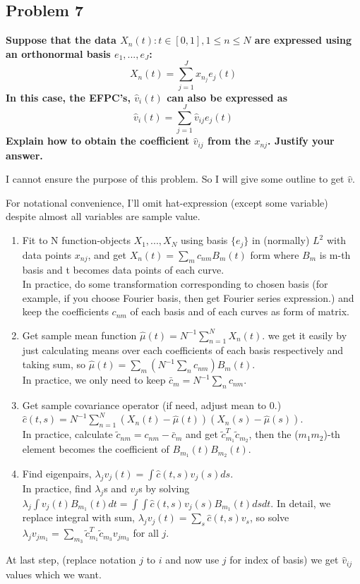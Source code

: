 \documentclass{article}
\begin{document}
\subsection{Problem 7}
\textbf{
Suppose that the data ${X_n(t):t\in[0,1], 1\leq n\leq N}$
are expressed using an orthonormal basis $e_1,...,e_J$:
\[X_n(t)=\sum_{j=1}^J x_{n_j}e_j(t)\]
In this case, the EFPC's, $\hat{v}_i(t)$ can also be expressed as
\[\hat{v}_i(t)=\sum_{j=1}^J \hat{v}_{ij}e_j(t)\]
Explain how to obtain the coefficient $\hat{v}_{ij}$ from the $x_{nj}$. 
Justify your answer.
}

I cannot ensure the purpose of this problem. So I will give some outline to get $\hat{v}$.

For notational convenience, I'll omit hat-expression (except some variable) despite almost all variables are sample value.
\begin{enumerate}
\item Fit to N function-objects $X_1,...,X_N$ using basis $\{e_j\}$ in (normally) $L^2$ with data points $x_{nj}$,
    and get $X_n(t)=\sum_m c_{nm}B_m(t)$ form where $B_m$ is m-th basis and t becomes data points of each curve. \\
    In practice, do some transformation corresponding to chosen basis 
    (for example, if you choose Fourier basis, then get Fourier series expression.)
     and keep the coefficients $c_{nm}$ of each basis and of each curves as form of matrix.
\item Get sample mean function $\hat{\mu}(t)=N^{-1}\sum_{n=1}^NX_n(t)$.
    we get it easily by just calculating means over each coefficients of each basis respectively and taking sum,
    so $\hat{\mu}(t)=\sum_m(N^{-1}\sum_nc_{nm})B_m(t)$. \\
    In practice, we only need to keep $\bar{c}_m=N^{-1}\sum_nc_{nm}$.
\item Get sample covariance operator (if need, adjust mean to 0.) $\hat{c}(t,s)=N^{-1}\sum_{n=1}^N(X_n(t)-\hat{\mu}(t))(X_n(s)-\hat{\mu}(s))$.\\
    In practice, calculate $\tilde{c}_{nm}=c_{nm}-\bar{c}_{m}$ and get $\tilde{c}_{m_1}^{T}\tilde{c}_{m_2}$,
    then the ($m_1m_2$)-th element becomes the coefficient of $B_{m_1}(t)B_{m_2}(t)$.
\item Find eigenpairs, $\lambda_j v_j(t) = \int\hat{c}(t,s)v_j(s)ds$. \\ 
    In practice, find $\lambda_j$s and $v_j$s by solving $\lambda_j\int v_j(t)B_{m_1}(t)dt = \int \int \hat{c}(t,s)v_j(s)B_{m_1}(t)ds dt$.
    In detail, we replace integral with sum, $\lambda_j v_j(t) = \sum_{s} \hat{c}(t,s)v_s$, so solve
    $\lambda_jv_{jm_1}=\sum_{m_3}\tilde{c}_{m_1}^{T}\tilde{c}_{m_3} v_{jm_3}$ for all $j$.
\end{enumerate}
At last step, (replace notation $j$ to $i$ and now use $j$ for index of basis) we get $\hat{v}_{ij}$ values which we want.
\end{document}
